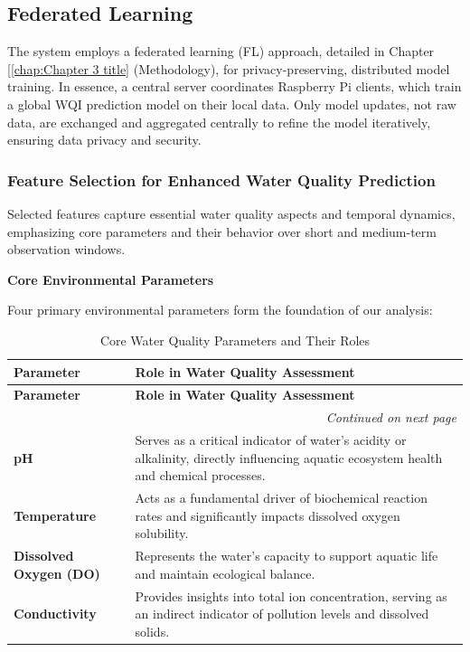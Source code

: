\subsection{Federated Learning}

The system employs a federated learning (FL) approach, detailed in Chapter [\ref{chap:Chapter 3 title} (Methodology), for privacy-preserving, distributed model training. In essence, a central server coordinates Raspberry Pi clients, which train a global WQI prediction model on their local data. Only model updates, not raw data, are exchanged and aggregated centrally to refine the model iteratively, ensuring data privacy and security.

\subsubsection{Feature Selection for Enhanced Water Quality Prediction}
Selected features capture essential water quality aspects and temporal dynamics, emphasizing core parameters and their behavior over short and medium-term observation windows.

\textbf{Core Environmental Parameters}

Four primary environmental parameters form the foundation of our analysis:

\begin{longtable}{p{3.5cm}p{10cm}}
\caption{Core Water Quality Parameters and Their Roles} \\
\toprule
\textbf{Parameter} & \textbf{Role in Water Quality Assessment} \\
\midrule
\endfirsthead

\toprule
\textbf{Parameter} & \textbf{Role in Water Quality Assessment} \\
\midrule
\endhead

\midrule
\multicolumn{2}{r}{\small\itshape Continued on next page} \\
\midrule
\endfoot

\bottomrule
\endlastfoot

\textbf{pH} &
Serves as a critical indicator of water's acidity or alkalinity, directly influencing aquatic ecosystem health and chemical processes. \\
\midrule

\textbf{Temperature} &
Acts as a fundamental driver of biochemical reaction rates and significantly impacts dissolved oxygen solubility. \\
\midrule

\textbf{Dissolved Oxygen (DO)} &
Represents the water's capacity to support aquatic life and maintain ecological balance. \\
\midrule

\textbf{Conductivity} &
Provides insights into total ion concentration, serving as an indirect indicator of pollution levels and dissolved solids. \\
\end{longtable}


